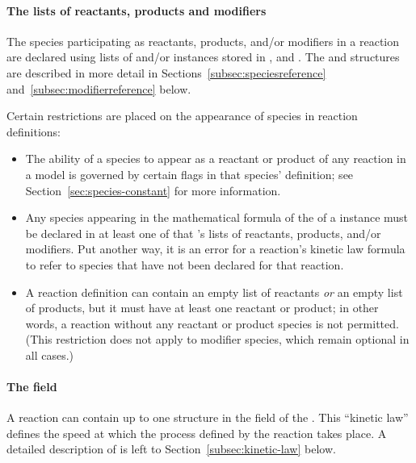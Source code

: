 \paragraph{The lists of reactants, products and modifiers}

The species participating as reactants, products, and/or modifiers
in a reaction are declared using lists of \SpeciesReference and/or
\ModifierSpeciesReference instances stored in
,  and
.  The \SpeciesReference and
\ModifierSpeciesReference structures are described in more detail
in Sections~\ref{subsec:speciesreference}
and~\ref{subsec:modifierreference} below.

Certain restrictions are placed on the appearance of species in
reaction definitions:
\begin{itemize}
  
\item The ability of a species to appear as a reactant or product
  of any reaction in a model is governed by certain flags in that
  species' definition; see Section~\ref{sec:species-constant} for
  more information.
  
\item Any species appearing in the mathematical formula of the
   of a \Reaction instance must be declared in
  at least one of that \Reaction's lists of reactants, products,
  and/or modifiers.  Put another way, it is an error for a
  reaction's kinetic law formula to refer to species that have not
  been declared for that reaction.
  
\item A reaction definition can contain an empty list of reactants
  \emph{or} an empty list of products, but it must have at least
  one reactant or product; in other words, a reaction without any
  reactant or product species is not permitted.  (This restriction
  does not apply to modifier species, which remain optional in all
  cases.)

\end{itemize}


\paragraph{The  field}

A reaction can contain up to one \KineticLaw structure in the
 field of the \Reaction.  This ``kinetic law''
defines the speed at which the process defined by the reaction
takes place.  A detailed description of \KineticLaw is left to
Section~\ref{subsec:kinetic-law} below.

